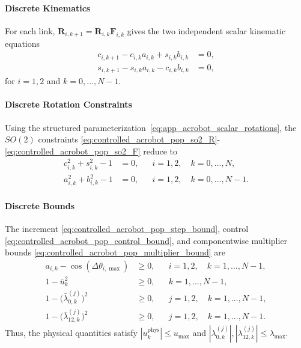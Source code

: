 \paragraph{Discrete Kinematics}

For each link, \(\bm{R}_{i,k+1}=\bm{R}_{i,k}\bm{F}_{i,k}\) gives the two independent scalar
kinematic equations
\begin{subequations}
\label{eq:app_acrobot_scalar_kinematics}
\begin{align}
c_{i,k+1}-c_{i,k}a_{i,k}+s_{i,k}b_{i,k}&=0,
\label{eq:app_acrobot_kinematics_c}\\
s_{i,k+1}-s_{i,k}a_{i,k}-c_{i,k}b_{i,k}&=0,
\label{eq:app_acrobot_kinematics_s}
\end{align}
\end{subequations}
for $i=1,2$ and $k=0,\ldots,N-1$.

\paragraph{Discrete Rotation Constraints}

Using the structured
parameterization~\eqref{eq:app_acrobot_scalar_rotations}, the $SO(2)$
constraints \eqref{eq:controlled_acrobot_pop_so2_R}-\eqref{eq:controlled_acrobot_pop_so2_F} reduce to
\begin{subequations}
\label{eq:app_acrobot_scalar_so2_constraints}
\begin{align}
c_{i,k}^2+s_{i,k}^2-1&=0,
&&i=1,2,\quad k=0,\ldots,N,
\label{eq:app_acrobot_so2_R}\\
a_{i,k}^2+b_{i,k}^2-1&=0,
&&i=1,2,\quad k=0,\ldots,N-1.
\label{eq:app_acrobot_so2_F}
\end{align}
\end{subequations}

\paragraph{Discrete Bounds}

The increment \eqref{eq:controlled_acrobot_pop_step_bound}, control
\eqref{eq:controlled_acrobot_pop_control_bound}, and componentwise multiplier bounds \eqref{eq:controlled_acrobot_pop_multiplier_bound}
are
\begin{subequations}
\label{eq:app_acrobot_scalar_bounds}
\begin{align}
a_{i,k}-\cos(\Delta\theta_{i,\max})&\geq0,
&&i=1,2,\quad k=1,\ldots,N-1,
\label{eq:app_acrobot_step_bounds}\\
1-\bar u_k^2&\geq0,
&&k=1,\ldots,N-1,
\label{eq:app_acrobot_control_bounds}\\
1-\bigl(\bar\lambda_{0,k}^{(j)}\bigr)^2&\geq0,
&&j=1,2,\quad k=1,\ldots,N-1,
\label{eq:app_acrobot_lambda0_bounds}\\
1-\bigl(\bar\lambda_{12,k}^{(j)}\bigr)^2&\geq0,
&&j=1,2,\quad k=1,\ldots,N-1.
\label{eq:app_acrobot_lambda12_bounds}
\end{align}
\end{subequations}
Thus, the physical quantities satisfy
$|u_k^{\mathrm{phys}}|\leq u_{\max}$ and
$|\lambda_{0,k}^{(j)}|,
 |\lambda_{12,k}^{(j)}|\leq\lambda_{\max}$.

